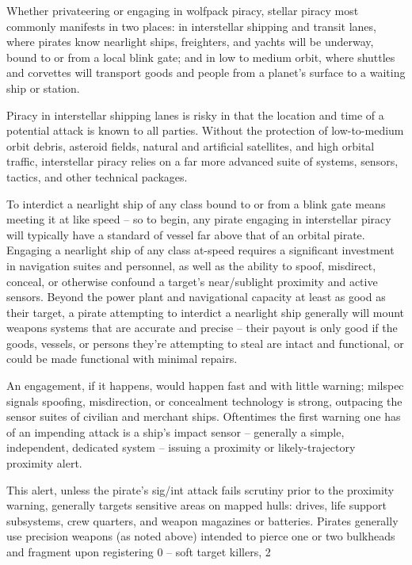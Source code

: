 Whether privateering or engaging in wolfpack piracy, stellar piracy most commonly manifests in
two places: in interstellar shipping and transit lanes, where pirates know nearlight ships,
freighters, and yachts will be underway, bound to or from a local blink gate; and in low to
medium orbit, where shuttles and corvettes will transport goods and people from a planet’s
surface to a waiting ship or station.


Piracy in interstellar shipping lanes is risky in that the location and time of a potential attack is
known to all parties. Without the protection of low-to-medium orbit debris, asteroid fields, natural
and artificial satellites, and high orbital traffic, interstellar piracy relies on a far more advanced
suite of systems, sensors, tactics, and other technical packages.


To interdict a nearlight ship of any class bound to or from a blink gate means meeting it at like
speed -- so to begin, any pirate engaging in interstellar piracy will typically have a standard of
vessel far above that of an orbital pirate. Engaging a nearlight ship of any class at-speed requires
a significant investment in navigation suites and personnel, as well as the ability to spoof,
misdirect, conceal, or otherwise confound a target’s near/sublight proximity and active sensors.
Beyond the power plant and navigational capacity at least as good as their target, a pirate
attempting to interdict a nearlight ship generally will mount weapons systems that are accurate
and precise -- their payout is only good if the goods, vessels, or persons they’re attempting to
steal are intact and functional, or could be made functional with minimal repairs.





An engagement, if it happens, would happen fast and with little warning; milspec signals
spoofing, misdirection, or concealment technology is strong, outpacing the sensor suites of
civilian and merchant ships. Oftentimes the first warning one has of an impending attack is a
ship’s impact sensor -- generally a simple, independent, dedicated system -- issuing a proximity
or likely-trajectory proximity alert.


This alert, unless the pirate’s sig/int attack fails scrutiny prior to the proximity warning, generally
targets sensitive areas on mapped hulls: drives, life support subsystems, crew quarters, and
weapon magazines or batteries. Pirates generally use precision weapons (as noted above)
intended to pierce one or two bulkheads and fragment upon registering 0  -- soft target killers,
                                                                                            2

